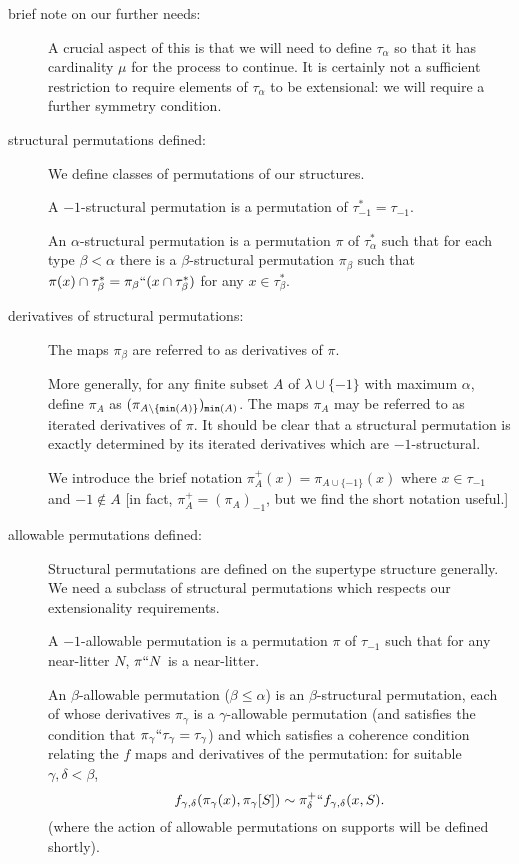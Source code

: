 \documentclass[112pt]{article}
\begin{document}
\begin{description}



\item[brief note on our further needs:]  A crucial aspect of this is that we will need to define $\tau_\alpha$ so that it has cardinality $\mu$ for the process to continue.  It is certainly not a sufficient restriction to require elements of $\tau_\alpha$ to be extensional:  we will require a further symmetry condition.

\item[structural permutations defined:]  We define classes of permutations of our structures.

A $-1$-structural permutation is a permutation of $\tau_{-1}^* = \tau_{-1}$.

An $\alpha$-structural permutation is a permutation $\pi$ of $\tau_\alpha^*$ such that for each type $\beta<\alpha$ there is a $\beta$-structural permutation
$\pi_\beta$ such that $\pi(x) \cap \tau^*_\beta = \pi_\beta``(x \cap \tau^*_\beta)$ for any $x \in \tau^*_\beta$.

\item[derivatives of structural permutations:]  The maps $\pi_\beta$ are referred to as derivatives of $\pi$.

  More generally, for any finite subset $A$ of $\lambda \cup \{-1\}$ with maximum $\alpha$,
define $\pi_A$ as $(\pi_{A \setminus \{{\tt min}(A)\}})_{{\tt min}(A)}$.  The maps $\pi_A$ may be referred to as iterated derivatives of $\pi$.  It should be clear that a structural permutation is exactly determined by its iterated derivatives which are $-1$-structural.

We introduce the brief notation $\pi^+_A(x) = \pi_{A \cup \{-1\}}(x)$ where $x \in \tau_{-1}$ and $-1 \not\in A$ [in fact, $\pi^+_A = (\pi_A)_{-1}$, but we find the short notation useful.]

\item[allowable permutations defined:]  Structural permutations are defined on the supertype structure generally.  We need a subclass of structural permutations which respects our extensionality requirements.

A $-1$-allowable permutation is a permutation $\pi$ of $\tau_{-1}$ such that for any near-litter $N$, $\pi``N$ is a near-litter.

An $\beta$-allowable permutation ($\beta \leq \alpha$) is an $\beta$-structural permutation, each of whose derivatives $\pi_\gamma$ is a $\gamma$-allowable permutation (and satisfies the condition that $\pi_\gamma``\tau_\gamma = \tau_\gamma$) and which satisfies a coherence condition relating the $f$ maps and derivatives of the permutation:  for suitable $\gamma,\delta<\beta$, $$f_{\gamma,\delta}(\pi_\gamma(x),\pi_{\gamma}[S]) \sim \pi_\delta^+``f_{\gamma,\delta}(x,S).$$  (where the action of allowable
 permutations on supports will be defined shortly).


\end{description}
\end{document}
